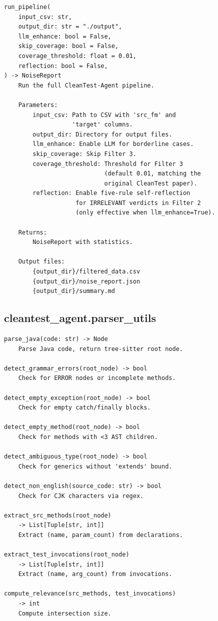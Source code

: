 \documentclass[acmlarge,nonacm,screen]{acmart}
\begin{document}
\begin{lstlisting}[language={},breaklines=true]
run_pipeline(
    input_csv: str,
    output_dir: str = "./output",
    llm_enhance: bool = False,
    skip_coverage: bool = False,
    coverage_threshold: float = 0.01,
    reflection: bool = False,
) -> NoiseReport
    Run the full CleanTest-Agent pipeline.
    
    Parameters:
        input_csv: Path to CSV with 'src_fm' and
                   'target' columns.
        output_dir: Directory for output files.
        llm_enhance: Enable LLM for borderline cases.
        skip_coverage: Skip Filter 3.
        coverage_threshold: Threshold for Filter 3
                            (default 0.01, matching the
                            original CleanTest paper).
        reflection: Enable five-rule self-reflection
                    for IRRELEVANT verdicts in Filter 2
                    (only effective when llm_enhance=True).
    
    Returns:
        NoiseReport with statistics.
    
    Output files:
        {output_dir}/filtered_data.csv
        {output_dir}/noise_report.json
        {output_dir}/summary.md
\end{lstlisting}

\subsection{cleantest\_agent.parser\_utils}

\begin{lstlisting}[language={},breaklines=true]
parse_java(code: str) -> Node
    Parse Java code, return tree-sitter root node.

detect_grammar_errors(root_node) -> bool
    Check for ERROR nodes or incomplete methods.

detect_empty_exception(root_node) -> bool
    Check for empty catch/finally blocks.

detect_empty_method(root_node) -> bool
    Check for methods with <3 AST children.

detect_ambiguous_type(root_node) -> bool
    Check for generics without 'extends' bound.

detect_non_english(source_code: str) -> bool
    Check for CJK characters via regex.

extract_src_methods(root_node)
    -> List[Tuple[str, int]]
    Extract (name, param_count) from declarations.

extract_test_invocations(root_node)
    -> List[Tuple[str, int]]
    Extract (name, arg_count) from invocations.

compute_relevance(src_methods, test_invocations)
    -> int
    Compute intersection size.
\end{lstlisting}
\end{document}
